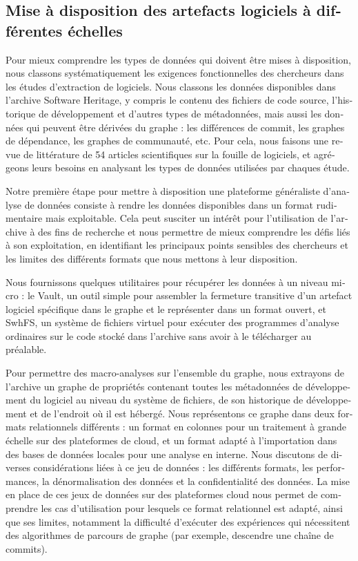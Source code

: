 \begin{otherlanguage}{french}
\subsection*{Mise à disposition des artefacts logiciels à différentes échelles}

Pour mieux comprendre les types de données qui doivent être mises à
disposition, nous classons systématiquement les exigences fonctionnelles des
chercheurs dans les études d'extraction de logiciels. Nous classons les données
disponibles dans l'archive Software Heritage, y compris le contenu des fichiers
de code source, l'historique de développement et d'autres types de métadonnées,
mais aussi les données qui peuvent être dérivées du graphe : les différences de
commit, les graphes de dépendance, les graphes de communauté, etc.
Pour cela, nous faisons une revue de littérature de 54 articles scientifiques
sur la fouille de logiciels, et agrégeons leurs besoins en analysant les types
de données utilisées par chaques étude.

Notre première étape pour mettre à disposition une plateforme généraliste
d'analyse de données consiste à rendre les données disponibles dans un format
rudimentaire mais exploitable. Cela peut susciter un intérêt pour l'utilisation
de l'archive à des fins de recherche et nous permettre de mieux comprendre les
défis liés à son exploitation, en identifiant les principaux points sensibles
des chercheurs et les limites des différents formats que nous mettons à leur
disposition.

Nous fournissons quelques utilitaires pour récupérer les données à un niveau
micro : le Vault, un outil simple pour assembler la fermeture transitive d'un
artefact logiciel spécifique dans le graphe et le représenter dans un format
ouvert, et SwhFS, un système de fichiers virtuel pour exécuter des programmes
d'analyse ordinaires sur le code stocké dans l'archive sans avoir à le
télécharger au préalable.

Pour permettre des macro-analyses sur l'ensemble du graphe, nous extrayons de
l'archive un graphe de propriétés contenant toutes les métadonnées de
développement du logiciel au niveau du système de fichiers, de son historique
de développement et de l'endroit où il est hébergé. Nous représentons ce graphe
dans deux formats relationnels différents : un format en colonnes pour un
traitement à grande échelle sur des plateformes de cloud, et un format adapté à
l'importation dans des bases de données locales pour une analyse en interne.
Nous discutons de diverses considérations liées à ce jeu de données : les
différents formats, les performances, la dénormalisation des données et la
confidentialité des données. La mise en place de ces jeux de données sur des
plateformes cloud nous permet de comprendre les cas d'utilisation pour lesquels
ce format relationnel est adapté, ainsi que ses limites, notamment la
difficulté d'exécuter des expériences qui nécessitent des algorithmes de
parcours de graphe (par exemple, descendre une chaîne de commits).


\end{otherlanguage}
